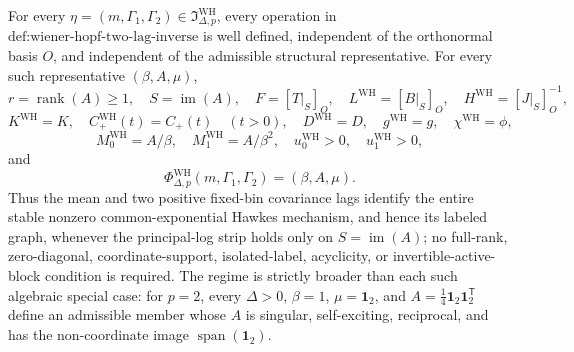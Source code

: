 For every \(\eta=(m,\Gamma_1,\Gamma_2)\in\mathfrak I_{\Delta,p}^{\mathrm{WH}}\), every operation in \(\text{def:wiener-hopf-two-lag-inverse}\) is well defined, independent of the orthonormal basis \(O\), and independent of the admissible structural representative.  For every such representative \((\beta,A,\mu)\),
\[
 r=\operatorname{rank}(A)\geq1,\quad S=\operatorname{im}(A),\quad
 F=[T|_S]_O,\quad L^{\mathrm{WH}}=[B|_S]_O,\quad
 H^{\mathrm{WH}}=[J|_S]_O^{-1},
\]
\[
 K^{\mathrm{WH}}=K,\quad C_{+}^{\mathrm{WH}}(t)=C_{+}(t)\quad(t>0),\quad
 D^{\mathrm{WH}}=D,\quad g^{\mathrm{WH}}=g,\quad
 \chi^{\mathrm{WH}}=\phi,
\]
\[
 M_0^{\mathrm{WH}}=A/\beta,\quad M_1^{\mathrm{WH}}=A/\beta^2,\quad
 u_0^{\mathrm{WH}}>0,\quad u_1^{\mathrm{WH}}>0,
\]
and
\[
 \Phi_{\Delta,p}^{\mathrm{WH}}(m,\Gamma_1,\Gamma_2)=(\beta,A,\mu).
\]
Thus the mean and two positive fixed-bin covariance lags identify the entire stable nonzero common-exponential Hawkes mechanism, and hence its labeled graph, whenever the principal-log strip holds only on \(S=\operatorname{im}(A)\); no full-rank, zero-diagonal, coordinate-support, isolated-label, acyclicity, or invertible-active-block condition is required.  The regime is strictly broader than each such algebraic special case: for \(p=2\), every \(\Delta>0\), \(\beta=1\), \(\mu=\mathbf 1_2\), and \(A=\tfrac14\mathbf 1_2\mathbf 1_2^{\mathsf T}\) define an admissible member whose \(A\) is singular, self-exciting, reciprocal, and has the non-coordinate image \(\operatorname{span}(\mathbf 1_2)\).